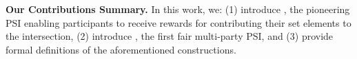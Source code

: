 \vspace{-4mm}
\begin{paragraph}
%
{\textbf{Our Contributions Summary.}} In this work, we: (1) introduce \withRew, the pioneering PSI enabling  participants to receive rewards for contributing their set elements to the intersection, (2) introduce \withFai, the first fair multi-party PSI, and (3) provide formal definitions of the aforementioned constructions.
%
\end{paragraph}










%












%













